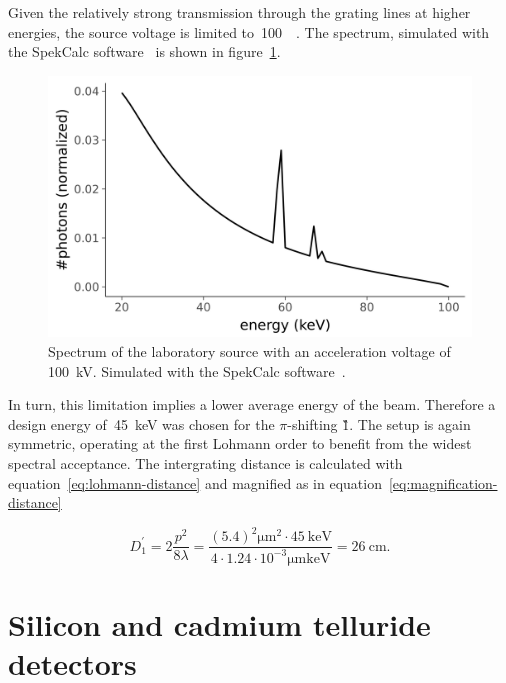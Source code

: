 Given the relatively strong transmission through the grating lines at higher
energies, the source voltage is limited to~\SI{100}{\kilo\voltpeak}. The
spectrum, simulated with the SpekCalc software~\parencite{spekcalc} is shown in
figure~\ref{fig:spectrum-100kV}.

\begin{figure}[htb]
    \centering
    \includegraphics[width=\textwidth]{gfx/spectrum-visibility/spectrum-100kV.png}
    \caption[Spectrum of the laboratory source at \SI{100}{\kilo\voltpeak}]{Spectrum of the laboratory source with an acceleration voltage of
        \SI{100}{\kilo\volt}. Simulated with the SpekCalc
        software~\parencite{spekcalc}.}
    \label{fig:spectrum-100kV}
\end{figure}

In turn, this limitation implies a lower average energy of the beam.
Therefore a design energy of~\SI{45}{\kilo\eV} was chosen for the
$\pi$-shifting \G1. The setup is again symmetric, operating at the first
Lohmann order to benefit from the widest spectral acceptance. The
intergrating distance is calculated with
equation~\eqref{eq:lohmann-distance} and magnified as in
equation~\eqref{eq:magnification-distance}

\begin{equation}
    D_1^\prime = 2\frac{p^2}{8\lambda} =
    \frac{(5.4)^2\si{\micro\meter\squared} \cdot \SI{45}{\kilo\eV}}{4
        \cdot 1.24 \cdot 10^{-3}\si{\micro\meter\kilo\eV}} =
        \SI{26}{\centi\meter}.
    \label{eq:intergrating-distance}
\end{equation}

\section{Silicon and cadmium telluride detectors}

